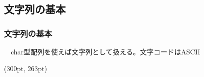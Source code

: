 \documentclass[dvipdfmx]{beamer}
\begin{document}
\subsection{文字列の基本}
\begin{frame}[t, fragile]
    \frametitle{文字列の基本}
    　char型配列を使えば文字列として扱える。文字コードはASCII
    
    \begin{textblock*}{0.3\linewidth}(300pt, 263pt)
        \space
    \end{textblock*}
\end{frame}
\end{document}
